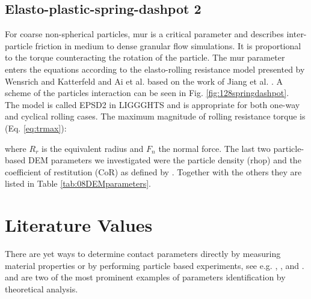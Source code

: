 % 
% 
% 
% 
% 

\subsection{Elasto-plastic-spring-dashpot 2}
\label{subsec:epsd2}

For coarse non-spherical particles, \acs{mur} is a critical parameter and describes
inter-particle friction in medium to dense granular flow simulations. 
It is proportional to the 
torque counteracting the rotation of the particle. 
The \acs{mur} parameter enters the 
equations according to the elasto-rolling resistance model presented by Wensrich and 
Katterfeld \cite{RefWorks:87} and Ai et al. \cite{RefWorks:131} 
based on the work of Jiang et al. \cite{RefWorks:143}. 
A scheme of the particles interaction can be seen in Fig.
\ref{fig:128springdashpot}.\\

The model is called EPSD2 in \acs{LIGGGHTS} and is appropriate for both one-way and cyclical rolling cases.
The maximum magnitude of rolling resistance torque is (Eq. \ref{eq:trmax}):



where $R_r$ is the equivalent radius and $F_n$ the normal force.
The last two particle-based \acs{DEM} parameters we investigated were 
the particle density (\acs{rhop})
and the coefficient of restitution (\acs{CoR}) as defined by
\citet{RefWorks:131}.
Together with the others they are listed in Table \ref{tab:08DEMparameters}.\\



\section{Literature Values}
\label{sec:literaturevalues}

There are yet ways to determine contact parameters directly by measuring
material properties or by performing particle based experiments, see e.g.
\citet{RefWorks:177}, \citet{RefWorks:181}, and \citet{RefWorks:186}.
\citet{RefWorks:140} and \citet{RefWorks:190}
are two of the most prominent examples of parameters identification by
theoretical analysis. 

